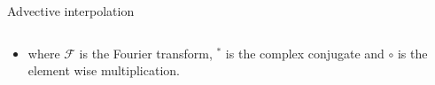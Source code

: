 \documentclass[final]{beamer}
\begin{document}
\begin{frame}{}
\begin{columns}[t]
\begin{column}{.3\linewidth}
\begin{block}{Advective interpolation}
\begin{columns}[t]
	\end{columns}
	      \begin{itemize}
	      \item where $\mathcal{F}$ is the Fourier transform, $^*$ is the complex conjugate and $\circ$ is the element wise multiplication. 
                \end{itemize}


\end{block}
\end{column}
\end{columns}
\end{frame}
\end{document}
